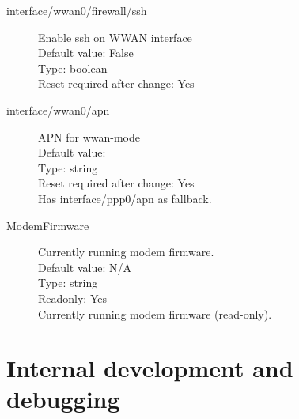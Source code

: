 \begin{description}
\item[interface/wwan0/firewall/ssh] Enable ssh on WWAN interface\\
  Default value: False\\
  Type: boolean\\
  Reset required after change: Yes\\

\item[interface/wwan0/apn] APN for wwan-mode\\
  Default value: \\
  Type: string\\
  Reset required after change: Yes\\
  Has interface/ppp0/apn as fallback.\\

\item[ModemFirmware] Currently running modem firmware.\\
  Default value: N/A\\
  Type: string\\
  Readonly: Yes\\
  Currently running modem firmware (read-only).\\

\end{description}
\pagebreak\section{Internal development and debugging}

